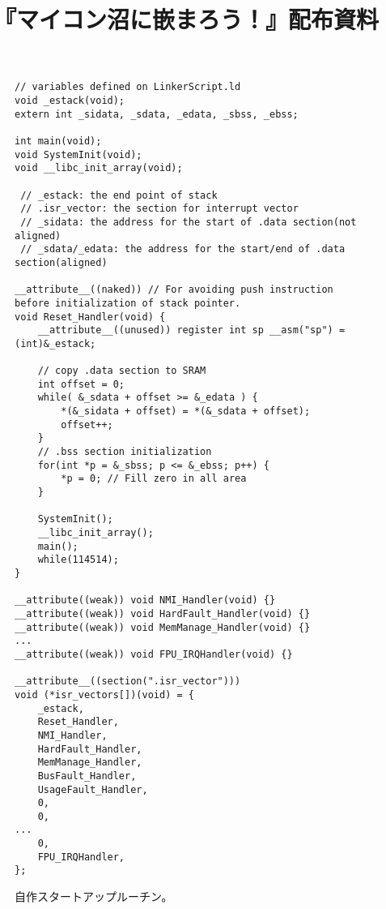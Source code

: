 \documentclass[uplatex]{jsarticle}
\title{\vspace{-3cm}『\textbf{マイコン沼に嵌まろう！}』配布資料\vspace{-1.5cm}}
\author{}
\date{}
\begin{document}
\maketitle
\begin{figure}[H]
	\begin{lstlisting}[style=clang]
// variables defined on LinkerScript.ld
void _estack(void);
extern int _sidata, _sdata, _edata, _sbss, _ebss;

int main(void);
void SystemInit(void);
void __libc_init_array(void);

 // _estack: the end point of stack
 // .isr_vector: the section for interrupt vector
 // _sidata: the address for the start of .data section(not aligned)
 // _sdata/_edata: the address for the start/end of .data section(aligned)

__attribute__((naked)) // For avoiding push instruction before initialization of stack pointer.
void Reset_Handler(void) {
	__attribute__((unused)) register int sp __asm("sp") = (int)&_estack;

	// copy .data section to SRAM
	int offset = 0;
	while( &_sdata + offset >= &_edata ) {
		*(&_sidata + offset) = *(&_sdata + offset);
		offset++;
	}
	// .bss section initialization
	for(int *p = &_sbss; p <= &_ebss; p++) {
		*p = 0; // Fill zero in all area
	}

	SystemInit();
	__libc_init_array();
	main();
	while(114514);
}

__attribute((weak)) void NMI_Handler(void) {}
__attribute((weak)) void HardFault_Handler(void) {}
__attribute((weak)) void MemManage_Handler(void) {}
...
__attribute((weak)) void FPU_IRQHandler(void) {}

__attribute__((section(".isr_vector")))
void (*isr_vectors[])(void) = {
	_estack,
	Reset_Handler,
	NMI_Handler,
	HardFault_Handler,
	MemManage_Handler,
	BusFault_Handler,
	UsageFault_Handler,
	0,
	0,
...
	0,
	FPU_IRQHandler,
};
	\end{lstlisting}
	\caption{自作スタートアップルーチン。}
\end{figure}
\end{document}
